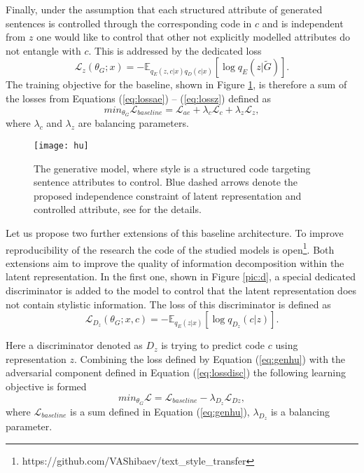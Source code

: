 \documentclass[11pt,a4paper]{article}
\begin{document}
Finally, under the assumption that each structured attribute of generated sentences is controlled through the corresponding code in $c$ and is independent from $z$ one would like to control that other not explicitly modelled attributes do not entangle with  $c$. This is addressed by the  dedicated loss
\begin{equation}
\label{eq:lossz}
\mathcal{L}_{z} (\theta_G; x) = - \mathbb{E}_{q_{E} (z,c|x) q_{D} (c|x)} \left[ \log q_E (z | \tilde{G}) \right].
\end{equation}
The training objective for the baseline, shown in Figure \ref{pic:hu}, is therefore a sum of the losses from Equations (\ref{eq:lossae}) -- (\ref{eq:lossz}) defined as
\begin{equation}
\label{eq:genhu}
min_{\theta_G} \mathcal{L}_{baseline} = \mathcal{L}_{ae} + \lambda_c \mathcal{L}_{c} + \lambda_z \mathcal{L}_{z},
\end{equation}
where $\lambda_c$ and $\lambda_z$ are balancing parameters.

\begin{figure}[ht]
\begin{center}
\centerline{\texttt{[image: hu]}}
\caption{The generative model, where style is a structured code targeting sentence attributes to control.
Blue dashed arrows denote the proposed independence constraint of latent representation and controlled attribute, see \cite{hylsx} for the details.}
\label{pic:hu}
\end{center}
\end{figure}

Let us propose two further extensions of this baseline architecture. To improve reproducibility of the research the code of the studied models is open\footnote{https://github.com/VAShibaev/text\_style\_transfer}. Both extensions aim to improve the quality of information decomposition within the latent representation. In the first one, shown in Figure \ref{pic:d}, a special dedicated discriminator is added to the model to control that the latent representation does not contain stylistic information. The loss of this discriminator is defined as
\begin{equation}
\label{eq:lossdisc}
\mathcal{L}_{D_z} (\theta_G; x,c) = - \mathbb{E}_{q_{E} (z|x)} \left[ \log q_{D_z} (c | z) \right].
\end{equation}

Here a discriminator denoted as $D_z$ is trying to predict code $c$ using representation $z$. Combining the loss defined by Equation (\ref{eq:genhu}) with the adversarial component defined in Equation (\ref{eq:lossdisc}) the following learning objective is formed
\begin{equation}
\label{eq:gendz}
min_{\theta_G} \mathcal{L} = \mathcal{L}_{baseline} - \lambda_{D_z} \mathcal{L}_{Dz},
\end{equation}
where $\mathcal{L}_{baseline}$ is a sum defined in Equation (\ref{eq:genhu}), $\lambda_{D_z}$ is a balancing parameter.
\end{document}

